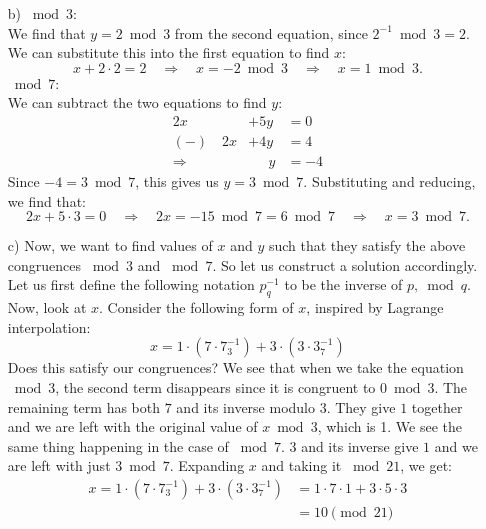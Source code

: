 \documentclass[]{article}
\begin{document}
\begin{qunlist}
{{\begin{enumerate}
\item[b)]
$\bmod 3$:\\
We find that $y=2 \bmod 3$ from the second equation, since $2^{-1} \bmod 3 = 2$. We can substitute this into the first equation to find $x$:
\[
x + 2\cdot2 = 2 \quad \Rightarrow \quad x = -2 \bmod 3 \quad \Rightarrow \quad x = 1 \bmod 3.
\]
$\bmod 7$:\\
We can subtract the two equations to find $y$:
\begin{align*}
2x &+ 5y &= 0 \\
(-) \quad 2x &+ 4y &= 4 \\
\hline
\Rightarrow \quad  & \quad \ \ y &= -4
\end{align*}
Since $-4 = 3\bmod 7$, this gives us $y = 3\bmod 7$. Substituting and reducing, we find that:
\[ 2x + 5\cdot 3 = 0 \quad \Rightarrow \quad 2x = -15 \bmod 7 = 6 \bmod 7 \quad \Rightarrow \quad x = 3\bmod 7. \]

\item[c)] Now, we want to find values of $x$ and $y$ such that they satisfy the above congruences $\bmod 3$ and $\bmod 7$. So let us construct a solution accordingly. Let us first define the following notation $p^{-1}_q$ to be the inverse of $p, \bmod q$.
Now, look at $x$. Consider the following form of $x$, inspired by Lagrange interpolation:
\[
x = 1 \cdot (7 \cdot 7^{-1}_3) + 3 \cdot (3 \cdot 3^{-1}_7)
\]
Does this satisfy our congruences? We see that when we take the equation $\bmod 3$, the second term disappears since it is congruent to $0 \bmod 3$. The remaining term has both $7$ and its inverse modulo $3$. They give $1$ together and we are left with the original value of $x\bmod 3$, which is 1. We see the same thing happening in the case of $\bmod 7$. $3$ and its inverse give $1$ and we are left with just $3\bmod 7$. Expanding $x$ and taking it $\bmod 21$, we get:
\begin{align*}
x = 1 \cdot (7 \cdot 7^{-1}_3) + 3 \cdot (3 \cdot 3^{-1}_7) &= 1 \cdot 7 \cdot 1 + 3 \cdot 5 \cdot 3 \\
&= \boxed{10 \pmod {21}}
\end{align*}


\end{enumerate}}}
\end{qunlist}
\end{document}
